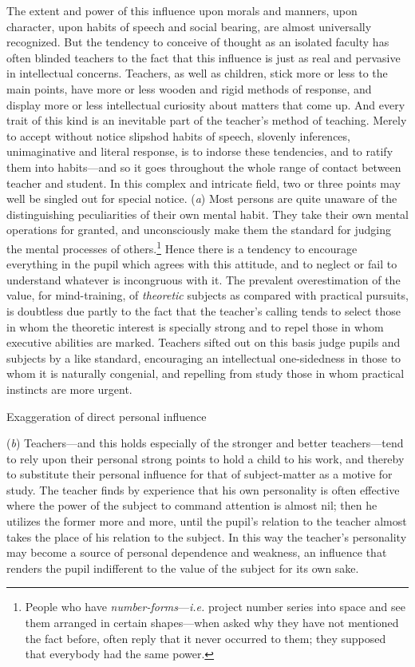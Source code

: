 \documentclass[letterpaper]{book}
\begin{document}
The extent and power of this influence upon morals and manners, upon
character, upon habits of speech and social bearing, are almost
universally recognized. But the tendency to conceive of thought as an
isolated faculty has often blinded teachers to the fact that this
influence is just as real and pervasive in intellectual concerns.
Teachers, as well as children, stick more or less to the main points,
have more or less wooden and rigid methods of response, and display more
or less intellectual curiosity about matters that come up. And every
trait of this kind is an inevitable part of the teacher's method of
teaching. Merely to accept without notice slipshod habits of speech,
slovenly inferences, unimaginative and literal response, is to indorse
these tendencies, and to ratify them into habits---and so it goes
throughout the whole range of contact between teacher and student. In
this complex and intricate field, two or three points may well be
singled out for special notice. (\emph{a}) Most persons are quite
unaware of the distinguishing peculiarities of their own mental habit.
They take their own mental operations for granted, and unconsciously
make them the standard for judging the mental processes of
others.\footnote{
People who have \emph{number-forms}---\emph{i.e.} project number series
into space and see them arranged in certain shapes---when asked why they
have not mentioned the fact before, often reply that it never occurred
to them; they supposed that everybody had the same power.
}
Hence
there
is a tendency to encourage everything in the pupil which agrees with
this attitude, and to neglect or fail to understand whatever is
incongruous with it. The prevalent overestimation of the value, for
mind-training, of \emph{theoretic} subjects as compared with practical
pursuits, is doubtless due partly to the fact that the teacher's calling
tends to select those in whom the theoretic interest is specially strong
and to repel those in whom executive abilities are marked. Teachers
sifted out on this basis judge pupils and subjects by a like standard,
encouraging an intellectual one-sidedness in those to whom it is
naturally congenial, and repelling from study those in whom practical
instincts are more urgent.

Exaggeration of direct personal influence

(\emph{b}) Teachers---and this holds especially of the stronger and
better teachers---tend to rely upon their personal strong points to hold
a child to his work, and thereby to substitute their personal influence
for that of subject-matter as a motive for study. The teacher finds by
experience that his own personality is often effective where the power
of the subject to command attention is almost nil; then he utilizes the
former more and more, until the pupil's relation to the teacher almost
takes the place of his relation to the subject. In this way the
teacher's personality may become a source of personal dependence and
weakness, an influence that renders the pupil indifferent to the value
of the subject for its own sake.
\end{document}
